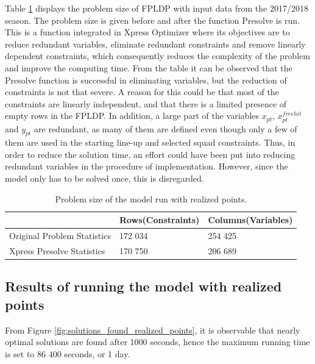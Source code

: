 Table \ref{tab:computational_statistics} displays the problem size of FPLDP with input data from the 2017/2018 season. The problem size is given before and after the function Presolve is run. This is a function integrated in Xpress Optimizer where its objectives are to reduce redundant variables, eliminate redundant constraints and remove linearly dependent constraints, which consequently reduces the complexity of the problem and improve the computing time. From the table it can be observed that the Presolve function is successful in eliminating variables, but the reduction of constraints is not that severe. A reason for this could be that most of the constraints are linearly independent, and that there is a limited presence of empty rows in the FPLDP. In addition, a large part of the variables $x_{pt}$, $x_{pt}^{freehit}$ and $y_{pt}$ are redundant, as many of them are defined even though only a few of them are used in the starting line-up and selected squad constraints. Thus, in order to reduce the solution time, an effort could have been put into reducing redundant variables in the procedure of implementation. However, since the model only has to be solved once, this is disregarded. 


\begin{table}[H]
\centering
\begin{tabular}{@{}lll@{}}
\toprule
                            & Rows(Constraints)    & Columns(Variables) 
                            \\ \midrule
Original Problem Statistics & 172 034 & 254 425   \\
Xpress Presolve Statistics  & 170 750 & 206 689   \\ 
\bottomrule
\end{tabular}
\caption{Problem size of the model run with realized points.}
\label{tab:computational_statistics}
\end{table}


\subsection{Results of running the model with realized points}

From Figure \ref{fig:solutions_found_realized_points}, it is observable that nearly optimal solutions are found after 1000 seconds, hence the maximum running time is set to 86 400 seconds, or 1 day. 

